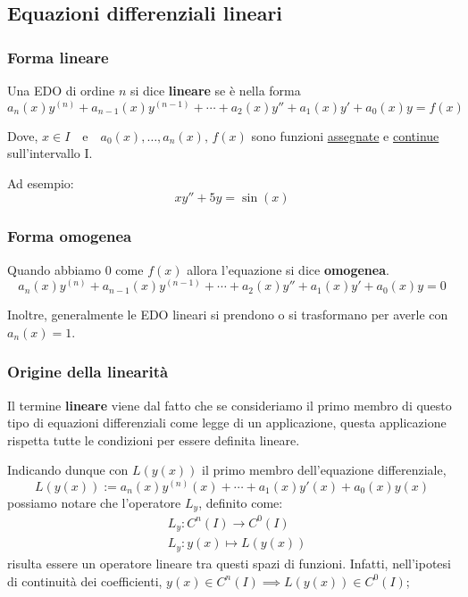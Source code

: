 \subsection{Equazioni differenziali lineari}

\subsubsection{Forma lineare}

Una EDO di ordine \(n\) si dice \textbf{lineare} se è nella forma
\[
    a_n(x)y^{(n)}+a_{n-1}(x)y^{(n-1)}+ \cdots + a_2(x)y''+a_1(x)y'+a_0(x)y=f(x)
\]

Dove, \(x \in I\)\ \ e\ \  \(a_0(x),\ldots,a_n(x),\,f(x)\) sono funzioni \underline{assegnate} e \underline{continue} sull'intervallo I.

Ad esempio:
\[
    xy''+5y = \sin(x)
\]

\subsubsection{Forma omogenea}

Quando abbiamo \(0\) come \(f(x)\) allora l'equazione si dice \textbf{omogenea}.
\[
    a_n(x)y^{(n)}+a_{n-1}(x)y^{(n-1)}+ \cdots + a_2(x)y''+a_1(x)y'+a_0(x)y=0
\]

Inoltre, generalmente le EDO lineari si prendono o si trasformano per averle con \(a_{n}(x) = 1\).

\subsubsection{Origine della linearità}

Il termine \textbf{lineare} viene dal fatto che se consideriamo il primo membro di questo tipo di equazioni differenziali come legge di un applicazione, questa applicazione rispetta tutte le condizioni per essere definita lineare.

Indicando dunque con \(L(y(x))\) il primo membro dell'equazione differenziale,
\[
    L(y(x)) := a_n (x) y^{(n)} (x) + \cdots + a_1(x)y'(x) + a_0(x)y(x)
\]
possiamo notare che l'operatore \(L_y\), definito come:
\begin{align*}
     & L_y: C^{n}(I) \rightarrow C^0(I) \\
     & L_y: y(x) \mapsto L(y(x))
\end{align*}
risulta essere un operatore lineare tra questi spazi di funzioni. Infatti, nell'ipotesi di continuità dei coefficienti, \(y(x) \in C^n(I) \implies L(y(x)) \in C^0(I)\);

